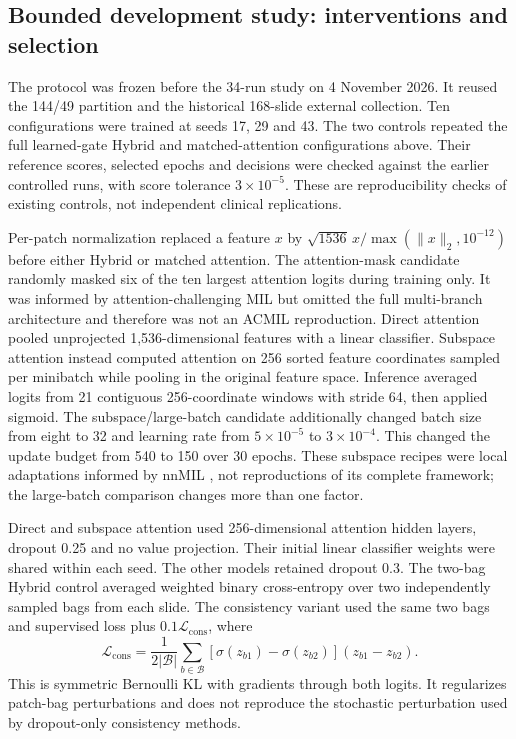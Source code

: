 \subsection{Bounded development study: interventions and selection}

The protocol was frozen before the 34-run study on 4 November 2026. It reused the 144/49 partition and the historical 168-slide external collection. Ten configurations were trained at seeds 17, 29 and 43. The two controls repeated the full learned-gate Hybrid and matched-attention configurations above. Their reference scores, selected epochs and decisions were checked against the earlier controlled runs, with score tolerance $3\times10^{-5}$. These are reproducibility checks of existing controls, not independent clinical replications.

Per-patch normalization replaced a feature $x$ by $\sqrt{1536}\,x/\max(\|x\|_2,10^{-12})$ before either Hybrid or matched attention. The attention-mask candidate randomly masked six of the ten largest attention logits during training only. It was informed by attention-challenging MIL \citep{ref30} but omitted the full multi-branch architecture and therefore was not an ACMIL reproduction. Direct attention pooled unprojected 1,536-dimensional features with a linear classifier. Subspace attention instead computed attention on 256 sorted feature coordinates sampled per minibatch while pooling in the original feature space. Inference averaged logits from 21 contiguous 256-coordinate windows with stride 64, then applied sigmoid. The subspace/large-batch candidate additionally changed batch size from eight to 32 and learning rate from $5\times10^{-5}$ to $3\times10^{-4}$. This changed the update budget from 540 to 150 over 30 epochs. These subspace recipes were local adaptations informed by nnMIL \citep{ref26}, not reproductions of its complete framework; the large-batch comparison changes more than one factor.

Direct and subspace attention used 256-dimensional attention hidden layers, dropout 0.25 and no value projection. Their initial linear classifier weights were shared within each seed. The other models retained dropout 0.3. The two-bag Hybrid control averaged weighted binary cross-entropy over two independently sampled bags from each slide. The consistency variant used the same two bags and supervised loss plus $0.1\mathcal{L}_{\mathrm{cons}}$, where
\begin{equation}
\mathcal{L}_{\mathrm{cons}}=\frac{1}{2|\mathcal B|}\sum_{b\in\mathcal B}
\left[\sigma(z_{b1})-\sigma(z_{b2})\right](z_{b1}-z_{b2}).
\end{equation}
This is symmetric Bernoulli KL with gradients through both logits. It regularizes patch-bag perturbations and does not reproduce the stochastic perturbation used by dropout-only consistency methods.

